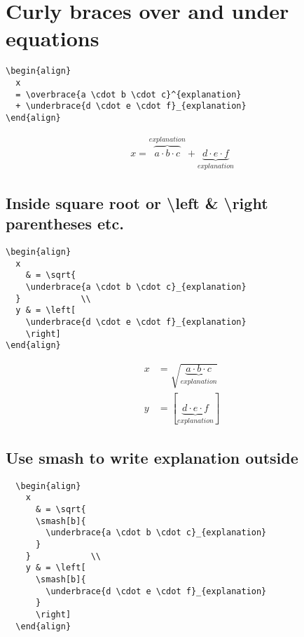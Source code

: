 \documentclass[../../latex]{subfiles}
\begin{document}
\section{Curly braces over and under equations}

\begin{verbatim}
\begin{align}
  x
  = \overbrace{a \cdot b \cdot c}^{explanation}
  + \underbrace{d \cdot e \cdot f}_{explanation}
\end{align}
\end{verbatim}

\begin{align}
  x
  = \overbrace{a \cdot b \cdot c}^{explanation}
  + \underbrace{d \cdot e \cdot f}_{explanation}
\end{align}

\subsection{Inside square root or \textbackslash left \& \textbackslash right parentheses etc.}

\begin{verbatim}
\begin{align}
  x
    & = \sqrt{
    \underbrace{a \cdot b \cdot c}_{explanation}
  }            \\
  y & = \left[
    \underbrace{d \cdot e \cdot f}_{explanation}
    \right]
\end{align}
\end{verbatim}

\begin{align}
  x
    & = \sqrt{
    \underbrace{a \cdot b \cdot c}_{explanation}
  }            \\
  y & = \left[
    \underbrace{d \cdot e \cdot f}_{explanation}
    \right]
\end{align}

\subsection{Use smash to write explanation outside}

\begin{verbatim}
  \begin{align}
    x
      & = \sqrt{
      \smash[b]{
        \underbrace{a \cdot b \cdot c}_{explanation}
      }
    }            \\
    y & = \left[
      \smash[b]{
        \underbrace{d \cdot e \cdot f}_{explanation}
      }
      \right]
  \end{align}
\end{verbatim}
\end{document}
